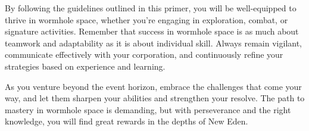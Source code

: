 \documentclass[a4paper,12pt]{report}
\begin{document}
By following the guidelines outlined in this primer, you will be well-equipped to thrive in wormhole space, whether you're engaging in exploration, combat, or signature activities. Remember that success in wormhole space is as much about teamwork and adaptability as it is about individual skill. Always remain vigilant, communicate effectively with your corporation, and continuously refine your strategies based on experience and learning.

As you venture beyond the event horizon, embrace the challenges that come your way, and let them sharpen your abilities and strengthen your resolve. The path to mastery in wormhole space is demanding, but with perseverance and the right knowledge, you will find great rewards in the depths of New Eden.
\end{document}
